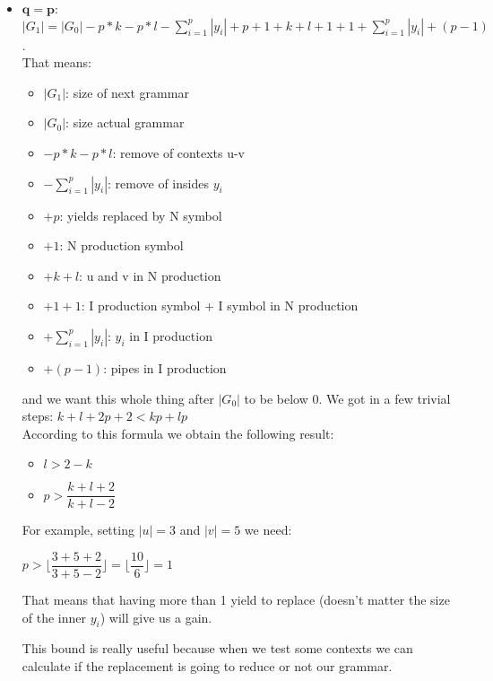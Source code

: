 \begin{itemize}
	\item $\bm{q=p}$: \\
		$|G_1| = |G_0| -p*k -p*l -\sum_{i=1}^{p}|y_i| + p + 1 + k + l + 1 + 1 + \sum_{i=1}^{p}|y_i| + (p-1)$. \\
		
		That means:\\

		\begin{itemize}
			\item $|G_1|$: size of next grammar 
			\item $|G_0|$: size actual grammar
			\item $-p*k-p*l$: remove of contexts u-v
			\item $-\sum_{i=1}^{p}|y_i|$: remove of insides $y_i$ 
			\item $+ p$: yields replaced by N symbol
			\item $+1$: N production symbol
			\item $+k+l$: u and v in N production
			\item $+1+1$: I production symbol + I symbol in N production
			\item $+ \sum_{i=1}^{p}|y_i|$: $y_i$ in I production
			\item $+(p-1)$: pipes in I production
		\end{itemize}


		and we want this whole thing after $|G_0|$ to be below 0. We got in a few trivial steps:
		$k+l+2p+2<kp+lp$\\
		According to this formula we obtain the following result:\\

		\begin{itemize}
					\item 	$l>2-k$ 
					\item   $p>\dfrac{k+l+2}{k+l-2}$
		\end{itemize}	

		For example, setting $|u|=3$ and $|v|=5$ we need:

		\begin{center}
			$p> \lfloor \dfrac{3+5+2}{3+5-2} \rfloor = \lfloor \dfrac{10}{6} \rfloor = 1 $
		\end{center}
		That means that having more than 1 yield to replace (doesn't matter the size of the inner $y_i$) will give us a gain.

		This bound is really useful because when we test some contexts we can calculate if the replacement is going to reduce or not our grammar.


\end{itemize}

